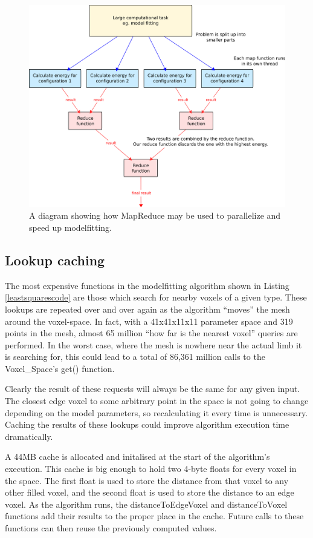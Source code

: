 \begin{figure}[tb]
	\centering
	\includegraphics[width=\textwidth]{mapreduce.png}
	\caption{A diagram showing how MapReduce may be used to parallelize and speed up modelfitting.}
	\label{MapReduceDiagram}
\end{figure}

\subsection{Lookup caching}

The most expensive functions in the modelfitting algorithm shown in Listing \ref{leastsquarescode} are those which search for nearby voxels of a given type.
These lookups are repeated over and over again as the algorithm ``moves'' the mesh around the voxel-space.
In fact, with a 41x41x11x11 parameter space and 319 points in the mesh, almost 65 million ``how far is the nearest voxel'' queries are performed.
In the worst case, where the mesh is nowhere near the actual limb it is searching for, this could lead to a total of 86,361 million calls to the Voxel\_Space's get() function.

Clearly the result of these requests will always be the same for any given input.
The closest edge voxel to some arbitrary point in the space is not going to change depending on the model parameters, so recalculating it every time is unnecessary.
Caching the results of these lookups could improve algorithm execution time dramatically.

A 44MB cache is allocated and initalised at the start of the algorithm's execution.
This cache is big enough to hold two 4-byte floats for every voxel in the space.
The first float is used to store the distance from that voxel to any other filled voxel, and the second float is used to store the distance to an edge voxel.
As the algorithm runs, the distanceToEdgeVoxel and distanceToVoxel functions add their results to the proper place in the cache.
Future calls to these functions can then reuse the previously computed values.

